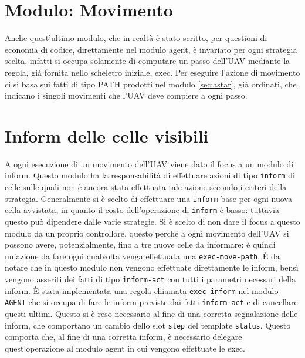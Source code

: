 \section{Modulo: Movimento} \label{sec:movimento}
Anche quest'ultimo modulo, che in realtà è stato scritto, per questioni di economia di codice, direttamente nel modulo agent, è invariato per ogni strategia scelta, infatti si occupa solamente di computare un passo dell'UAV mediante la regola, già fornita nello scheletro iniziale, exec. Per eseguire l'azione di movimento ci si basa sui fatti di tipo PATH prodotti nel modulo \ref{sec:astar}, già ordinati, che indicano i singoli movimenti che l'UAV deve compiere a ogni passo.

\section{Inform delle celle visibili} \label{sec:inform}
A ogni esecuzione di un movimento dell'UAV viene dato il focus a un modulo di inform. Questo modulo ha la responsabilità di effettuare azioni di tipo \texttt{inform} di celle sulle quali non è ancora stata effettuata tale azione secondo i criteri della strategia. Generalmente si è scelto di effettuare una \texttt{inform} base per ogni nuova cella avvistata, in quanto il costo dell'operazione di \texttt{inform} è basso: tuttavia questo può dipendere dalle varie strategie.
Si è scelto di non dare il focus a questo modulo da un proprio controllore, questo perché a ogni movimento dell'UAV si possono avere, potenzialmente, fino a tre nuove celle da informare: è quindi un'azione da fare ogni qualvolta venga effettuata una \texttt{exec-move-path}. È da notare che in questo modulo non vengono effettuate direttamente le inform, bensì vengono asseriti dei fatti di tipo \texttt{inform-act} con tutti i parametri necessari della inform. È stata implementata una regola chiamata \texttt{exec-inform} nel modulo \texttt{AGENT} che si occupa di fare le inform previste dai fatti \texttt{inform-act} e di cancellare questi ultimi. Questo si è reso necessario al fine di una corretta segnalazione delle inform, che comportano un cambio dello slot \texttt{step} del template \texttt{status}. Questo comporta che, al fine di una corretta inform, è necessario delegare quest'operazione al modulo agent in cui vengono effettuate le exec.
